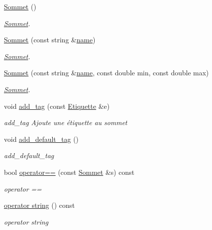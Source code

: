 \begin{DoxyCompactItemize}
\item 
\hyperlink{class_sommet_a6a049f1ba2ad29a1e90d2b7825a94b02}{Sommet} ()
\begin{DoxyCompactList}\small\item\em \hyperlink{class_sommet}{Sommet}. \end{DoxyCompactList}\item 
\hyperlink{class_sommet_a2a63d8435ecad7a32deaeb9318ec0d9c}{Sommet} (const string \&\hyperlink{class_sommet_af32fce50ed4a5b4473722921986b34e5}{name})
\begin{DoxyCompactList}\small\item\em \hyperlink{class_sommet}{Sommet}. \end{DoxyCompactList}\item 
\hyperlink{class_sommet_a8ade745a2010341b78af423cfd64e114}{Sommet} (const string \&\hyperlink{class_sommet_af32fce50ed4a5b4473722921986b34e5}{name}, const double min, const double max)
\begin{DoxyCompactList}\small\item\em \hyperlink{class_sommet}{Sommet}. \end{DoxyCompactList}\item 
void \hyperlink{class_sommet_ae8446cb3c6230aa93cd519e7e8cd1fb5}{add\+\_\+tag} (const \hyperlink{class_etiquette}{Etiquette} \&e)
\begin{DoxyCompactList}\small\item\em add\+\_\+tag Ajoute une étiquette au sommet \end{DoxyCompactList}\item 
void \hyperlink{class_sommet_aba5faabbf46c0d14871c12a5002e990a}{add\+\_\+default\+\_\+tag} ()
\begin{DoxyCompactList}\small\item\em add\+\_\+default\+\_\+tag \end{DoxyCompactList}\item 
bool \hyperlink{class_sommet_a549e20bbfaafc40ad446c39919752edc}{operator==} (const \hyperlink{class_sommet}{Sommet} \&s) const 
\begin{DoxyCompactList}\small\item\em operator == \end{DoxyCompactList}\item 
\hyperlink{class_sommet_a73879831abd8a29cfed2d406fc0bcb3f}{operator string} () const 
\begin{DoxyCompactList}\small\item\em operator string \end{DoxyCompactList}\item 

\end{DoxyCompactItemize}
